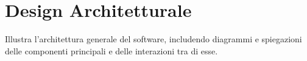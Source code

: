 \section{Design Architetturale}\label{sec:Design}
Illustra l'architettura generale del software, includendo diagrammi e spiegazioni delle componenti principali e delle interazioni tra di esse.
\newpage